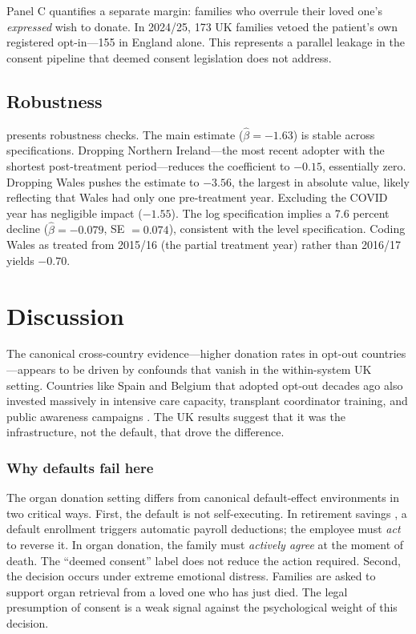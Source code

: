 \documentclass[12pt]{article}
\begin{document}
Panel C quantifies a separate margin: families who overrule their loved one's \textit{expressed} wish to donate. In 2024/25, 173 UK families vetoed the patient's own registered opt-in---155 in England alone. This represents a parallel leakage in the consent pipeline that deemed consent legislation does not address.



\subsection{Robustness}

 presents robustness checks. The main estimate ($\hat{\beta} = -1.63$) is stable across specifications. Dropping Northern Ireland---the most recent adopter with the shortest post-treatment period---reduces the coefficient to $-0.15$, essentially zero. Dropping Wales pushes the estimate to $-3.56$, the largest in absolute value, likely reflecting that Wales had only one pre-treatment year. Excluding the COVID year has negligible impact ($-1.55$). The log specification implies a 7.6 percent decline ($\hat{\beta} = -0.079$, SE $= 0.074$), consistent with the level specification. Coding Wales as treated from 2015/16 (the partial treatment year) rather than 2016/17 yields $-0.70$.



\section{Discussion}

The canonical cross-country evidence---higher donation rates in opt-out countries---appears to be driven by confounds that vanish in the within-system UK setting. Countries like Spain and Belgium that adopted opt-out decades ago also invested massively in intensive care capacity, transplant coordinator training, and public awareness campaigns \citep{matesanz2009international}. The UK results suggest that it was the infrastructure, not the default, that drove the difference.

\subsubsection*{Why defaults fail here} The organ donation setting differs from canonical default-effect environments in two critical ways. First, the default is not self-executing. In retirement savings \citep{madrian2001power}, a default enrollment triggers automatic payroll deductions; the employee must \textit{act} to reverse it. In organ donation, the family must \textit{actively agree} at the moment of death. The ``deemed consent'' label does not reduce the action required. Second, the decision occurs under extreme emotional distress. Families are asked to support organ retrieval from a loved one who has just died. The legal presumption of consent is a weak signal against the psychological weight of this decision.
\end{document}

